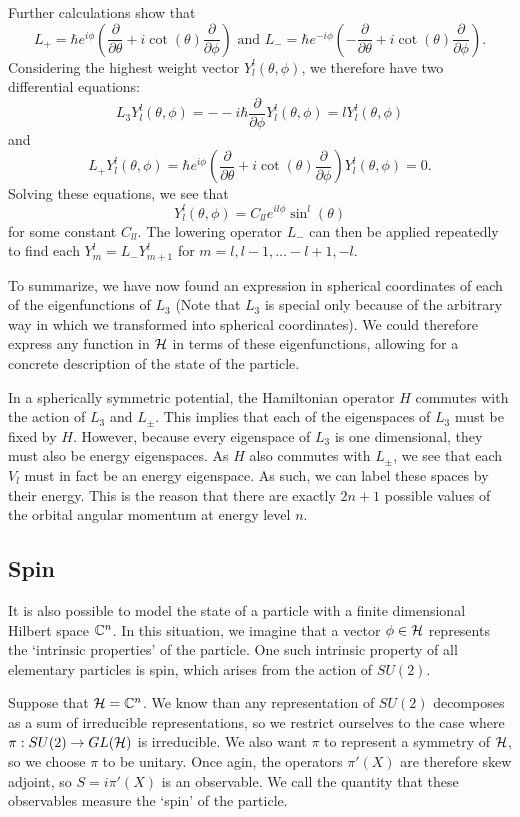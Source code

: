\documentclass[a4paper]{article}
\begin{document}
Further calculations show that 
$$L_{+} = \hbar e^{i\phi} \left(\frac{\partial}{\partial \theta} + i\cot(\theta)\frac{\partial}{\partial \phi}\right) \text{  and  } L_{-} = \hbar e^{-i\phi} \left(-\frac{\partial}{\partial \theta} + i\cot(\theta)\frac{\partial}{\partial \phi}\right).$$
Considering the highest weight vector $Y^l_{l}(\theta, \phi)$, we therefore have two differential equations: $$L_3 Y^l_{l}(\theta, \phi) = - -i\hbar \frac{\partial}{\partial \phi} Y^l_{l}(\theta, \phi) = l Y^l_{l}(\theta, \phi)$$ 
and 
$$L_{+} Y^l_{l}(\theta, \phi) = \hbar e^{i\phi} \left(\frac{\partial}{\partial \theta} + i\cot(\theta)\frac{\partial}{\partial \phi}\right)Y^l_{l}(\theta, \phi) = 0.$$
Solving these equations, we see that 
$$Y^l_{l}(\theta, \phi) = C_{ll} e^{il\phi}\sin^{l}(\theta)$$
for some constant $C_{ll}$. The lowering operator $L_{-}$ can then be applied repeatedly to find each $Y^l_{m} = L_{-}Y^l_{m+1}$ for $m = l, l -1, \hdots -l + 1, -l$.

To summarize, we have now found an expression in spherical coordinates of each of the eigenfunctions of $L_3$ (Note that $L_3$ is special only because of the arbitrary way in which we transformed into spherical coordinates). We could therefore express any function in $\mathcal{H}$ in terms of these eigenfunctions, allowing for a concrete description of the state of the particle.

In a spherically symmetric potential, the Hamiltonian operator $H$ commutes with the action of $L_3$ and $L_{\pm}$. This implies that each of the eigenspaces of $L_3$ must be fixed by $H$. However, because every eigenspace of $L_3$ is one dimensional, they must also be energy eigenspaces. As $H$ also commutes with $L_{\pm}$, we see that each $V_l$ must in fact be an energy eigenspace. As such, we can label these spaces by their energy. This is the reason that there are exactly $2n+ 1$ possible values of the orbital angular momentum at energy level $n$.

\subsection{Spin}
It is also possible to model the state of a particle with a finite dimensional Hilbert space $\mathbb{C}^n$. In this situation, we imagine that a vector $\phi \in \mathcal{H}$ represents the `intrinsic properties' of the particle. One such intrinsic property of all elementary particles is spin, which arises from the action of $SU(2)$. 

Suppose that $\mathcal{H} = \mathbb{C}^n$. We know than any representation of $SU(2)$ decomposes as a sum of irreducible representations, so we restrict ourselves to the case where $\pi : SU(2) \to GL(\mathcal{H})$ is irreducible. We also want $\pi$ to represent a symmetry of $\mathcal{H}$, so we choose $\pi$ to be unitary. Once agin, the operators $\pi'(X)$ are therefore skew adjoint, so $S = i\pi'(X)$ is an observable. We call the quantity that these observables measure the `spin' of the particle. 
\end{document}
